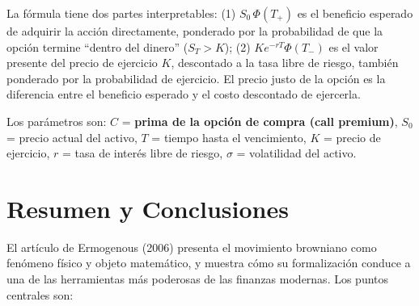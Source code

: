 \documentclass[12pt]{article}
\begin{document}
\begin{intuicionmat}
La f\'ormula tiene dos partes interpretables: (1) $S_0\,\Phi(T_+)$ es el beneficio esperado de adquirir la acci\'on directamente, ponderado por la probabilidad de que la opci\'on termine ``dentro del dinero'' ($S_T > K$); (2) $Ke^{-rT}\Phi(T_-)$ es el valor presente del precio de ejercicio $K$, descontado a la tasa libre de riesgo, tambi\'en ponderado por la probabilidad de ejercicio. El precio justo de la opci\'on es la diferencia entre el beneficio esperado y el costo descontado de ejercerla.
\end{intuicionmat}

Los par\'ametros son: $C$ = \textbf{prima de la opci\'on de compra (call premium)}, $S_0$ = precio actual del activo, $T$ = tiempo hasta el vencimiento, $K$ = precio de ejercicio, $r$ = tasa de inter\'es libre de riesgo, $\sigma$ = volatilidad del activo.

\section{Resumen y Conclusiones}

El art\'iculo de Ermogenous (2006) presenta el movimiento browniano como fen\'omeno f\'isico y objeto matem\'atico, y muestra c\'omo su formalizaci\'on conduce a una de las herramientas m\'as poderosas de las finanzas modernas. Los puntos centrales son:
\end{document}
